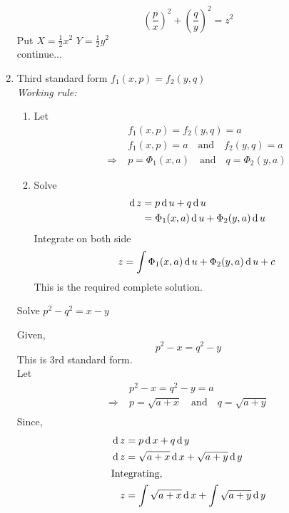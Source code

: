\documentclass[../main-sheet.tex]{subfiles}
\begin{document}
\begin{enumerate}[label=\underline{Type - \Roman*}:]
\begin{soln}
\begin{equation}
                \left( \frac{p}{x} \right)^2+\left( \frac{q}{y} \right)^2=z^2\label{eq:t2.5.1}
            \end{equation}
            Put \(X=\frac{1}{2}x^2\) \(Y=\frac{1}{2}y^2\)\\
            continue...
        \end{soln}
    \item  Third standard form \(f_1(x,p)=f_2(y,q)\)\\
    \emph{Working rule:}
    \begin{enumerate}[label=\arabic*]
        \item Let
            \begin{align*}
                &f_1(x,p)=f_2(y,q)=a\\
                &f_1(x,p)=a\quad \text{and}\quad f_2(y,q)=a\\
                \Rightarrow\;&p=\Phi_1(x,a)\quad \text{and}\quad q=\Phi_2(y,a)
            \end{align*}
        \item Solve 
        \begin{align*}
            \,\mathrm{d}\, z&=p\,\mathrm{d}\, u+q\,\mathrm{d}\, u\\
            &=\Phi_1(x,a)\,\mathrm{d}\, u+\Phi_2(y,a)\,\mathrm{d}\, u
        \end{align*}
        Integrate on both side
        \[z=\int \Phi_1(x,a)\,\mathrm{d}\, u+\Phi_2(y,a)\,\mathrm{d}\, u+c\]
        This is the required complete solution.
    \end{enumerate}
    \begin{prob}
        Solve \(p^2-q^2=x-y\)
    \end{prob}
    \begin{soln}
        Given,
        \begin{equation}
            p^2-x=q^2-y\label{eq:t3.1.1}
        \end{equation}
        This is 3rd standard form.\\
        Let 
        \begin{align*}
            &p^2-x=q^2-y=a\\
            \Rightarrow\;&p=\sqrt{a+x}\quad \text{and}\quad q=\sqrt{a+y}\\
        \end{align*}
        Since,
        \begin{align*}
            \dz&=p \dx+q\dy\\
            \dz&=\sqrt{a+x}\dx+\sqrt{a+y}\dy\\
            \intertext{Integrating,}
            z&=\int\sqrt{a+x}\dx+\int\sqrt{a+y}\dy\\

\end{align*}
\end{soln}
\end{enumerate}
\end{document}
